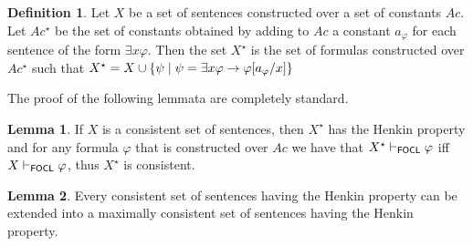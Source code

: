 \documentclass{article}
\theoremstyle{definition}
\newtheorem{definition}{Definition}[section]
\newtheorem{lemma}{Lemma}
\begin{document}




\begin{definition}
    Let $X$ be a set of sentences constructed over a set of constants $Ac$. Let $Ac^\star$ be the set of constants obtained by adding to $Ac$ a constant $a_{\varphi}$ for each sentence of the form $\exists x \varphi$. Then the set $X^\star$ is the set of formulas constructed over $Ac^\star$  such that $X^\star = X \cup \{\psi \mid \psi = \exists x \varphi \to \varphi[a_\varphi /x]\}$ 
\end{definition}


The proof of the following lemmata are completely standard. 
\begin{lemma}
    If $X$ is a consistent set of sentences, then $X^\star$ has the Henkin property and for any formula $\varphi$ that is constructed over $Ac$ we have that $X^\star \vdash_{\mathsf{FOCL}} \varphi$ iff $X\vdash_{\mathsf{FOCL}} \varphi$, thus $X^\star$ is consistent. 
\end{lemma}

\begin{lemma}
\label{lemma:lindy}
    Every consistent set of sentences having the Henkin property can be extended into a maximally consistent set of sentences having the Henkin property. 
\end{lemma}




\end{document}
